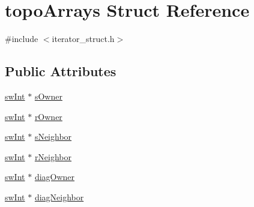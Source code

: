 \hypertarget{structtopoArrays}{
\section{topoArrays Struct Reference}
\label{structtopoArrays}
}


{\ttfamily \#include $<$iterator\_\-struct.h$>$}\subsection*{Public Attributes}
\begin{DoxyCompactItemize}
\item 
\hyperlink{swMacro_8h_a113cf5f6b5377cdf3fac6aa4e443e9aa}{swInt} $\ast$ \hyperlink{structtopoArrays_a121406d935900f19c089bd8168a803f7}{sOwner}
\item 
\hyperlink{swMacro_8h_a113cf5f6b5377cdf3fac6aa4e443e9aa}{swInt} $\ast$ \hyperlink{structtopoArrays_a67f0893bcaaccfed33e94814a4ccabde}{rOwner}
\item 
\hyperlink{swMacro_8h_a113cf5f6b5377cdf3fac6aa4e443e9aa}{swInt} $\ast$ \hyperlink{structtopoArrays_a94d583a57fddecfe783b02cf4d2bcd1e}{sNeighbor}
\item 
\hyperlink{swMacro_8h_a113cf5f6b5377cdf3fac6aa4e443e9aa}{swInt} $\ast$ \hyperlink{structtopoArrays_a010f7191ca0f319e5e16daf50cc9b0e2}{rNeighbor}
\item 
\hyperlink{swMacro_8h_a113cf5f6b5377cdf3fac6aa4e443e9aa}{swInt} $\ast$ \hyperlink{structtopoArrays_a16a09e43e4a177ae1ce6d62327186ddd}{diagOwner}
\item 
\hyperlink{swMacro_8h_a113cf5f6b5377cdf3fac6aa4e443e9aa}{swInt} $\ast$ \hyperlink{structtopoArrays_a733608e9e5b25298161b3e088ee25bcb}{diagNeighbor}
\end{DoxyCompactItemize}


